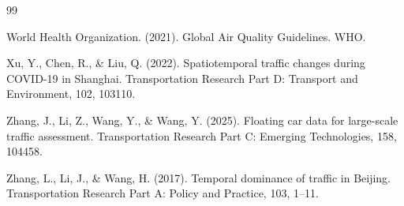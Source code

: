 \documentclass[12pt,a4paper]{article}
\begin{document}
\begin{thebibliography}{99}
\item World Health Organization. (2021). Global Air Quality Guidelines. WHO.

\item Xu, Y., Chen, R., \& Liu, Q. (2022). Spatiotemporal traffic changes during COVID-19 in Shanghai. Transportation Research Part D: Transport and Environment, 102, 103110.

\item Zhang, J., Li, Z., Wang, Y., \& Wang, Y. (2025). Floating car data for large-scale traffic assessment. Transportation Research Part C: Emerging Technologies, 158, 104458.

\item Zhang, L., Li, J., \& Wang, H. (2017). Temporal dominance of traffic in Beijing. Transportation Research Part A: Policy and Practice, 103, 1--11.

\end{thebibliography}
\end{document}
